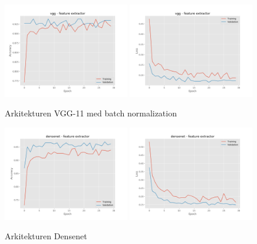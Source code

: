 \documentclass{kththesis}
\begin{document}
    \begin{figure}
      \centering
      \includegraphics[width=0.49\textwidth]{"./balcony/balcony-20split - acc - vgg - feature extractor"}
      \includegraphics[width=0.49\textwidth]{"./balcony/balcony-20split - loss - vgg - feature extractor"}
      \caption{Arkitekturen VGG-11 med batch normalization}
    \end{figure}

    \begin{figure}
      \centering
      \includegraphics[width=0.49\textwidth]{"./balcony/balcony-20split - acc - densenet - feature extractor"}
      \includegraphics[width=0.49\textwidth]{"./balcony/balcony-20split - loss - densenet - feature extractor"}
      \caption{Arkitekturen Densenet}
    \end{figure}
\end{document}
